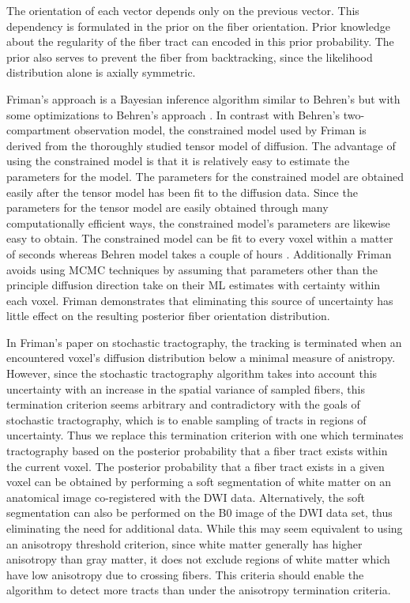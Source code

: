The orientation of each vector depends only on the previous vector.  This dependency is formulated in the prior on the fiber orientation.  Prior knowledge about the regularity of the fiber tract can encoded in this prior probability.  The prior also serves to prevent the fiber from backtracking, since the likelihood distribution alone is axially symmetric.

Friman's approach is a Bayesian inference algorithm similar to Behren's but with some optimizations to Behren's approach \cite{frimanTMI06}.  In contrast with Behren's two-compartment observation model, the constrained model used by Friman is derived from the thoroughly studied tensor model of diffusion.  The advantage of using the constrained model is that it is relatively easy to estimate the parameters for the model.  The parameters for the constrained model are obtained easily after the tensor model has been fit to the diffusion data.  Since the parameters for the tensor model are easily obtained through many computationally efficient ways, the constrained model's parameters are likewise easy to obtain.  The constrained model can be fit to every voxel within a matter of seconds whereas Behren model takes a couple of hours \cite{frimanTMI06}.  Additionally Friman avoids using MCMC techniques by assuming that parameters other than the principle diffusion direction take on their ML estimates with certainty within each voxel.  Friman demonstrates that eliminating this source of uncertainty has little effect on the resulting posterior fiber orientation distribution.

In Friman's paper on stochastic tractography, the tracking is terminated when an encountered voxel's diffusion distribution below a minimal measure of anistropy.  However, since the stochastic tractography algorithm takes into account this uncertainty with an increase in the spatial variance of sampled fibers, this termination criterion seems arbitrary and contradictory with the goals of stochastic tractography, which is to enable sampling of tracts in regions of uncertainty.  Thus we replace this termination criterion with one which terminates tractography based on the posterior probability that a fiber tract exists within the current voxel.  The posterior probability that a fiber tract exists in a given voxel can be obtained by performing a soft segmentation of white matter on an anatomical image co-registered with the DWI data.  Alternatively, the soft segmentation can also be performed on the B0 image of the DWI data set, thus eliminating the need for additional data.  While this may seem equivalent to using an anisotropy threshold criterion, since white matter generally has higher anisotropy than gray matter, it does not exclude regions of white matter which have low anisotropy due to crossing fibers.  This criteria should enable the algorithm to detect more tracts than under the anisotropy termination criteria.

